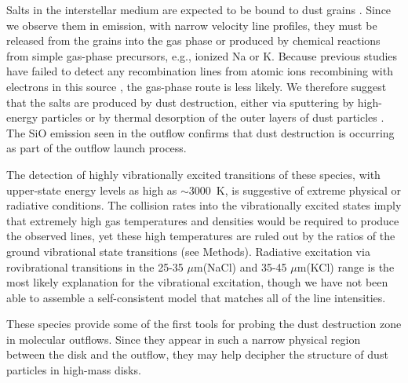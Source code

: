 \documentclass[12pt]{article}
\newcommand{\um}{\ensuremath{\mu \textrm{m}}\xspace}    %
\begin{document}
Salts in the interstellar medium are expected to be bound to dust grains
\cite{Cherchneff2012a}.  Since we observe them in emission, with narrow
velocity line profiles, they must be released from the grains into the gas
phase or produced by chemical reactions from simple gas-phase precursors,
e.g., ionized Na or K.  Because previous studies have failed to detect any
recombination lines from atomic ions recombining with electrons in this source
\cite{Plambeck2016a,Baez-Rubio2018a}, the gas-phase route is less likely. We
therefore suggest that the salts are produced by dust destruction, either via
sputtering by high-energy particles \cite{Schilke1997a} or by thermal
desorption of the outer layers of dust particles \cite{Decin2016a}.  The SiO
emission seen in the outflow confirms that dust destruction is occurring as
part of the outflow launch process.



The detection of highly vibrationally excited transitions of these species,
with upper-state energy levels as high as $\sim$3000~K, is suggestive of
extreme physical or radiative conditions.  
The collision rates into the vibrationally excited states imply that
extremely high gas temperatures and densities would be required to produce
the observed lines, yet these high temperatures are ruled out by the 
ratios of the ground vibrational state transitions (see Methods).
Radiative excitation via rovibrational transitions in the 25-35 \um (NaCl)
and 35-45 \um (KCl) range is the most likely explanation for the 
vibrational excitation, though we have not been able to assemble a self-consistent
model that matches all of the line intensities.

These species provide some of the first tools for probing the dust destruction
zone in molecular outflows.  Since they appear in such a narrow physical region
between the disk and the outflow, they may help decipher the structure of dust
particles in high-mass disks.  
\end{document}
